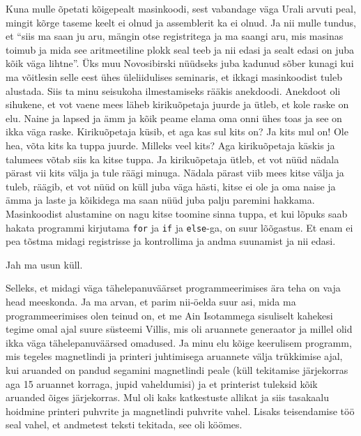 Kuna mulle õpetati kõigepealt masinkoodi, sest vabandage väga Urali arvuti 
peal, mingit  kõrge taseme keelt ei olnud ja assemblerit ka ei olnud. Ja nii 
mulle tundus, et \enquote{siis ma saan ju aru, mängin otse registritega ja ma 
saangi aru, mis masinas toimub ja mida see aritmeetiline plokk seal teeb ja nii 
edasi ja sealt edasi on juba kõik väga lihtne}. Üks muu Novosibirski nüüdseks 
juba kadunud sõber kunagi kui ma võitlesin selle eest ühes üleliidulises 
seminaris, et ikkagi masinkoodist tuleb alustada. Siis ta minu seisukoha 
ilmestamiseks rääkis anekdoodi. Anekdoot oli sihukene, et vot vaene mees läheb 
kirikuõpetaja juurde ja ütleb, et kole raske on elu. Naine ja lapsed ja ämm ja 
kõik peame elama oma onni ühes toas ja see on ikka väga raske. Kirikuõpetaja 
küsib, et aga kas sul kits on? Ja kits mul on! Ole hea, võta kits ka tuppa 
juurde. Milleks veel kits? Aga kirikuõpetaja käskis ja talumees võtab siis ka 
kitse tuppa. Ja kirikuõpetaja ütleb, et vot nüüd nädala pärast vii kits välja 
ja tule räägi minuga. Nädala pärast viib mees kitse välja ja tuleb, räägib, et 
vot nüüd on küll juba väga hästi, kitse ei ole ja oma naise ja ämma ja laste ja 
kõikidega ma saan nüüd juba palju paremini hakkama. Masinkoodist alustamine on 
nagu kitse toomine sinna tuppa, et kui lõpuks saab hakata programmi kirjutama 
\verb|for| ja \verb|if| ja \verb|else|-ga, on suur lõõgastus. Et enam ei pea 
tõstma midagi registrisse ja kontrollima ja andma suunamist ja nii edasi. 



Jah ma usun küll. 

Selleks, et midagi väga tähelepanuväärset programmeerimises ära teha on vaja 
head meeskonda. Ja ma arvan, et parim nii-öelda suur asi, mida ma 
programmeerimises olen teinud on, et me Ain Isotammega 
sisuliselt kahekesi tegime omal ajal suure süsteemi Villis, mis oli aruannete 
generaator ja millel olid ikka väga tähelepanuväärsed omadused. Ja minu elu 
kõige keerulisem programm, mis tegeles magnetlindi ja printeri juhtimisega 
aruannete välja trükkimise ajal, kui aruanded on pandud segamini magnetlindi 
peale (küll tekitamise järjekorras aga 15 aruannet korraga, jupid vaheldumisi) 
ja et  printerist tuleksid kõik aruanded õiges järjekorras. Mul oli kaks 
katkestuste allikat ja siis tasakaalu hoidmine printeri puhvrite ja magnetlindi 
puhvrite vahel. Lisaks teisendamise töö seal vahel, et andmetest teksti 
tekitada, see oli köömes. 

